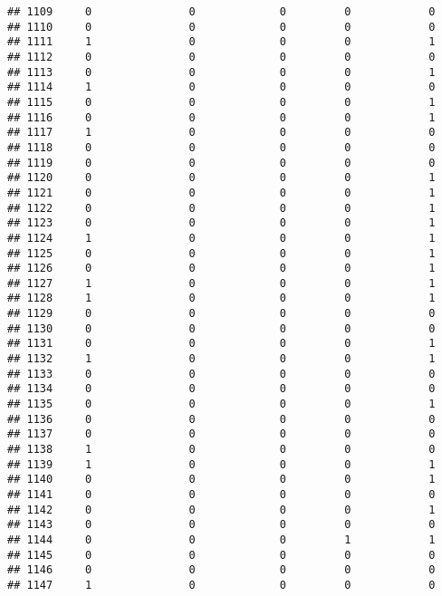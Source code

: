 \documentclass[]{article}
\begin{document}
\begin{verbatim}
## 1109     0               0             0         0            0
## 1110     0               0             0         0            0
## 1111     1               0             0         0            1
## 1112     0               0             0         0            0
## 1113     0               0             0         0            1
## 1114     1               0             0         0            0
## 1115     0               0             0         0            1
## 1116     0               0             0         0            1
## 1117     1               0             0         0            0
## 1118     0               0             0         0            0
## 1119     0               0             0         0            0
## 1120     0               0             0         0            1
## 1121     0               0             0         0            1
## 1122     0               0             0         0            1
## 1123     0               0             0         0            1
## 1124     1               0             0         0            1
## 1125     0               0             0         0            1
## 1126     0               0             0         0            1
## 1127     1               0             0         0            1
## 1128     1               0             0         0            1
## 1129     0               0             0         0            0
## 1130     0               0             0         0            0
## 1131     0               0             0         0            1
## 1132     1               0             0         0            1
## 1133     0               0             0         0            0
## 1134     0               0             0         0            0
## 1135     0               0             0         0            1
## 1136     0               0             0         0            0
## 1137     0               0             0         0            0
## 1138     1               0             0         0            0
## 1139     1               0             0         0            1
## 1140     0               0             0         0            1
## 1141     0               0             0         0            0
## 1142     0               0             0         0            1
## 1143     0               0             0         0            0
## 1144     0               0             0         1            1
## 1145     0               0             0         0            0
## 1146     0               0             0         0            0
## 1147     1               0             0         0            0

\end{verbatim}
\end{document}
